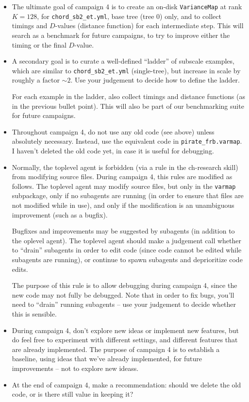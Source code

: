 \documentclass{article}
\numberwithin{equation}{section}   %
\begin{document}
\begin{itemize}

\item
The ultimate goal of campaign 4 is to create an on-disk \verb|VarianceMap|
at rank $K=128$, for \verb|chord_sb2_et.yml|, base tree (tree 0) only, and
to collect timings and $D$-values (distance function) for each intermediate
step. This will search as a benchmark for future campaigns, to try to improve
either the timing or the final $D$-value.

\item
A secondary goal is to curate a well-defined ``ladder'' of subscale examples,
which are similar to  \verb|chord_sb2_et.yml| (single-tree), but increase in
scale by roughly a factor $\sim 2$. Use your judgement to decide how to define
the ladder.

For each example in the ladder, also collect timings and distance functions
(as in the previous bullet point). This will also be part of our benchmarking
suite for future campaigns.

\item
Throughout campaign 4, do not use any old code (see above) unless absolutely necessary.
Instead, use the equivalent code in \verb|pirate_frb.varmap|.
I haven't deleted the old code yet, in case it is useful for debugging.

\item
Normally, the toplevel agent is forbidden (via a rule in the ch-research skill) from
modifying source files.
During campaign 4, this rules are modified as follows.
The toplevel agent may modify source files, but only in the \verb|varmap| subpackage,
only if no subagents are running (in order to ensure that files are not modified while in use),
and only if the modification is an unambiguous improvement (such as a bugfix).

Bugfixes and improvements may be suggested by subagents (in addition to the oplevel agent).
The toplevel agent should make a judgement call whether to ``drain'' subagents in order 
to edit code (since code cannot be edited while subagents are running),
or continue to spawn subagents and deprioritize code edits.

The purpose of this rule is to allow debugging during campaign 4,
since the new code may not fully be debugged.
Note that in order to fix bugs, you'll need to ``drain'' running subagents --
use your judgement to decide whether this is sensible.

\item
During campaign 4, don't explore new ideas or implement new features,
but do feel free to experiment with different settings, and different features
that are already implemented.
The purpose of campaign 4 is to establish a baseline, using ideas that we've
already implemented, for future improvements -- not to explore new ideass.

\item
At the end of campaign 4, make a recommendation: should we delete the old code,
or is there still value in keeping it?

\end{itemize}
\end{document}
